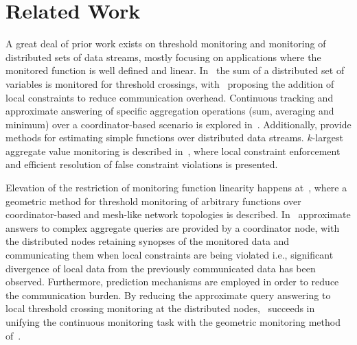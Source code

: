 \chapter{Related Work} \label{chap:relWork}

A great deal of prior work exists on threshold monitoring and monitoring of distributed sets of data streams, mostly focusing on applications where the monitored function is well defined and linear. In~\cite{DilmanReactiveMonitoring} the sum of a distributed set of variables is monitored for threshold crossings, with~\cite{KeralapuraCommEfficientThresholdCounts} proposing the addition of local constraints to reduce communication overhead. Continuous tracking and approximate answering of specific aggregation operations (sum, averaging and minimum) over a coordinator-based scenario is explored in~\cite{OlstonAdaptiveFiltersContQueries}. Additionally, \cite{GibbonsSimpleFuncEstimationOverUnion, GibbonsDistrStreamAlgosSlidingWindows} provide methods for estimating simple functions over distributed data streams. $k$-largest aggregate value monitoring is described in~\cite{BabcockDistributedTopk}, where local constraint enforcement and efficient resolution of false constraint violations is presented.

Elevation of the restriction of monitoring function linearity happens at~\cite{Sharfman2006GM}, where a geometric method for threshold monitoring of arbitrary functions over coordinator-based and mesh-like network topologies is described. In~\cite{CormodeApproxContQueryingDistrStreams} approximate answers to complex aggregate queries are provided by a coordinator node, with the distributed nodes retaining synopses of the monitored data and communicating them when local constraints are being violated i.e., significant divergence of local data from the previously communicated data has been observed. Furthermore, prediction mechanisms are employed in order to reduce the communication burden. By reducing the approximate query answering to local threshold crossing monitoring at the distributed nodes,~\cite{Garofalakis2013SketchBasedGM} succeeds in unifying the continuous monitoring task with the geometric monitoring method of~\cite{Sharfman2006GM}.

